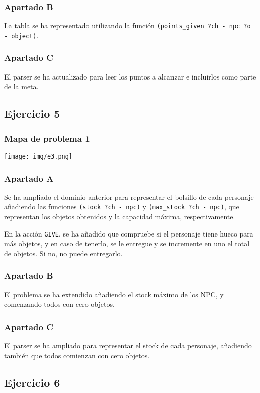 \documentclass[11pt,a4paper]{article}
\begin{document}
\subsubsection{Apartado B}
La tabla se ha representado utilizando la función \texttt{(points\_given ?ch - npc ?o - object)}.

\subsubsection{Apartado C}
El parser se ha actualizado para leer los puntos a alcanzar e incluirlos como parte de la meta.

\subsection{Ejercicio 5}
\subsubsection{Mapa de problema 1}
\texttt{[image: img/e3.png]}
\subsubsection{Apartado A}
Se ha ampliado el dominio anterior para representar el bolsillo de cada personaje añadiendo las funciones \texttt{(stock ?ch - npc)} y \texttt{(max\_stock ?ch - npc)}, que representan los objetos obtenidos y la capacidad máxima, respectivamente.

En la acción \texttt{GIVE}, se ha añadido que compruebe si el personaje tiene hueco para más objetos, y en caso de tenerlo, se le entregue y se incremente en uno el total de objetos. Si no, no puede entregarlo.

\subsubsection{Apartado B}
El problema se ha extendido añadiendo el stock máximo de los NPC, y comenzando todos con cero objetos. 

\subsubsection{Apartado C}
El parser se ha ampliado para representar el stock de cada personaje, añadiendo también que todos comienzan con cero objetos.

\subsection{Ejercicio 6}
\end{document}
